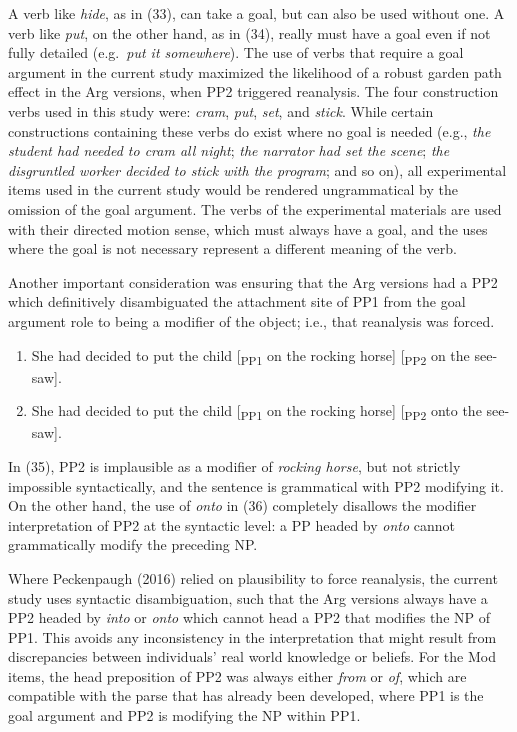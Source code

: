 \documentclass[11pt,oneside]{book}
\providecommand{\tightlist}{%
  \setlength{\itemsep}{0pt}\setlength{\parskip}{0pt}}
\begin{document}
A verb like \emph{hide}, as in (33), can take a goal, but can also be used without one. A verb like \emph{put}, on the other hand, as in (34), really must have a goal even if not fully detailed (e.g.~\emph{put it somewhere}). The use of verbs that require a goal argument in the current study maximized the likelihood of a robust garden path effect in the Arg versions, when PP2 triggered reanalysis. The four construction verbs used in this study were: \emph{cram}, \emph{put}, \emph{set}, and \emph{stick}. While certain constructions containing these verbs do exist where no goal is needed (e.g., \emph{the student had needed to cram all night}; \emph{the narrator had set the scene}; \emph{the disgruntled worker decided to stick with the program}; and so on), all experimental items used in the current study would be rendered ungrammatical by the omission of the goal argument. The verbs of the experimental materials are used with their directed motion sense, which must always have a goal, and the uses where the goal is not necessary represent a different meaning of the verb.

Another important consideration was ensuring that the Arg versions had a PP2 which definitively disambiguated the attachment site of PP1 from the goal argument role to being a modifier of the object; i.e., that reanalysis was forced.

\begin{enumerate}
\def\labelenumi{(\arabic{enumi})}
\setcounter{enumi}{34}
\tightlist
\item
  She had decided to put the child {[}\textsubscript{PP1} on the rocking horse{]} {[}\textsubscript{PP2} on the see-saw{]}.
\item
  She had decided to put the child {[}\textsubscript{PP1} on the rocking horse{]} {[}\textsubscript{PP2} onto the see-saw{]}.
\end{enumerate}

In (35), PP2 is implausible as a modifier of \emph{rocking horse}, but not strictly impossible syntactically, and the sentence is grammatical with PP2 modifying it. On the other hand, the use of \emph{onto} in (36) completely disallows the modifier interpretation of PP2 at the syntactic level: a PP headed by \emph{onto} cannot grammatically modify the preceding NP.

Where Peckenpaugh (2016) relied on plausibility to force reanalysis, the current study uses syntactic disambiguation, such that the Arg versions always have a PP2 headed by \emph{into} or \emph{onto} which cannot head a PP2 that modifies the NP of PP1. This avoids any inconsistency in the interpretation that might result from discrepancies between individuals' real world knowledge or beliefs. For the Mod items, the head preposition of PP2 was always either \emph{from} or \emph{of}, which are compatible with the parse that has already been developed, where PP1 is the goal argument and PP2 is modifying the NP within PP1.
\end{document}
